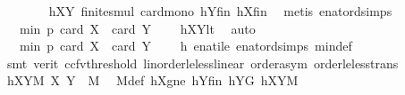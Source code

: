 \begin{isabellebody}
\ \ \ \ \ \ \isamarkupfalse%
\ hXY{}\ finite{\isacharunderscore}{\kern0pt}smul\ card{\isacharunderscore}{\kern0pt}mono\ hYfin\ hXfin\ \isamarkupfalse%
\ {\isacharparenleft}{\kern0pt}metis\ enat{\isacharunderscore}{\kern0pt}ord{\isacharunderscore}{\kern0pt}simps{\isacharparenleft}{\kern0pt}{}{\isacharparenright}{\kern0pt}{\isacharparenright}{\kern0pt}\isanewline
\ \ \ \ \isamarkupfalse%
\ \isamarkupfalse%
\ {\isachardoublequoteopen}{\isachardot}{\kern0pt}{\isachardot}{\kern0pt}{\isachardot}{\kern0pt}\ {\isacharless}{\kern0pt}\ min\ p\ {\isacharparenleft}{\kern0pt}card\ X\ {\isacharplus}{\kern0pt}\ card\ Y\ {\isacharminus}{\kern0pt}\ {}{\isacharparenright}{\kern0pt}{\isachardoublequoteclose}\ \isamarkupfalse%
\ hXYlt\ \isamarkupfalse%
\ auto\isanewline
\ \ \ \ \isamarkupfalse%
\ \isamarkupfalse%
\ {\isachardoublequoteopen}{\isachardot}{\kern0pt}{\isachardot}{\kern0pt}{\isachardot}{\kern0pt}\ {\isasymle}\ min\ p\ {\isacharparenleft}{\kern0pt}card\ {\isacharquery}{\kern0pt}X{}\ {\isacharplus}{\kern0pt}\ card\ {\isacharquery}{\kern0pt}Y{}\ {\isacharminus}{\kern0pt}\ {}{\isacharparenright}{\kern0pt}{\isachardoublequoteclose}\ \isamarkupfalse%
\ h\ enat{\isacharunderscore}{\kern0pt}ile\ enat{\isacharunderscore}{\kern0pt}ord{\isacharunderscore}{\kern0pt}simps{\isacharparenleft}{\kern0pt}{}{\isacharparenright}{\kern0pt}\ min{\isacharunderscore}{\kern0pt}def\isanewline
\ \ \ \ \ \ \isamarkupfalse%
\ {\isacharparenleft}{\kern0pt}smt\ {\isacharparenleft}{\kern0pt}verit{\isacharcomma}{\kern0pt}\ ccfv{\isacharunderscore}{\kern0pt}threshold{\isacharparenright}{\kern0pt}\ linorder{\isacharunderscore}{\kern0pt}le{\isacharunderscore}{\kern0pt}less{\isacharunderscore}{\kern0pt}linear\ order{\isachardot}{\kern0pt}asym\ order{\isacharunderscore}{\kern0pt}le{\isacharunderscore}{\kern0pt}less{\isacharunderscore}{\kern0pt}trans{\isacharparenright}{\kern0pt}\isanewline
\ \ \ \ \isamarkupfalse%
\ \isamarkupfalse%
\ hXY{}M{\isacharcolon}{\kern0pt}\ {\isachardoublequoteopen}{\isacharparenleft}{\kern0pt}{\isacharquery}{\kern0pt}X{}{\isacharcomma}{\kern0pt}\ {\isacharquery}{\kern0pt}Y{}{\isacharparenright}{\kern0pt}\ {\isasymin}\ M{\isachardoublequoteclose}\ \isamarkupfalse%
\ M{\isacharunderscore}{\kern0pt}def\ hXgne\ hY{}fin\ hY{}G\ hXYM\ \isamarkupfalse%

\end{isabellebody}
